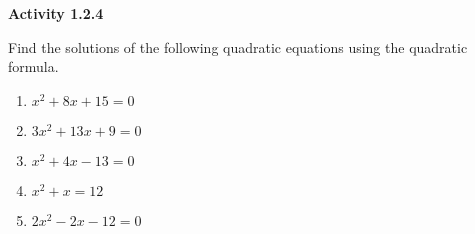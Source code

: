 \vspace{1ex}
\noindent\textbf{Activity 1.2.4}

\vspace{0.75ex}

Find the solutions of the following quadratic equations using the quadratic formula. 

\begin{multicols}{2}
\begin{enumerate}[label = \color{blue}\arabic*. ]
   \item $ x^2 + 8x +15 = 0 $  
   \item $ 3x^2 + 13x + 9 = 0 $
   \item $ x^2 + 4x - 13 = 0 $
   \item $ x^2 + x = 12 $
   \item $ 2x^2 - 2x - 12 = 0 $
\end{enumerate}
\end{multicols}
